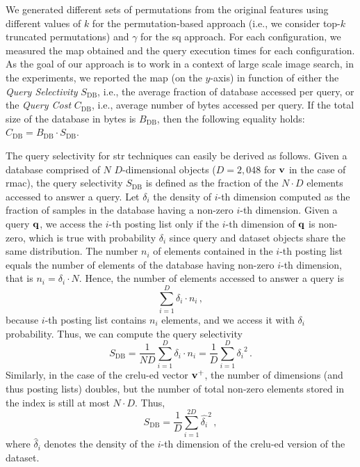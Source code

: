 We generated different sets of permutations from the original features using different values of $k$ for the permutation-based approach (i.e., we consider top-$k$ truncated permutations) and $\gamma$ for the \gls{sq} approach.
For each configuration, we measured the \acrfull{map} obtained and the query execution times for each configuration.
As the goal of our approach is to work in a context of large scale image search, in the experiments, we reported the \gls{map} (on the $y$-axis) in function of either the \emph{Query Selectivity} $S_\text{DB}$, i.e., the average fraction of database accessed per query, or the \emph{Query Cost} $C_\text{DB}$, i.e., average number of bytes accessed per query.
If the total size of the database in bytes is $B_\text{DB}$, then the following equality holds: $C_\text{DB} = B_\text{DB} \cdot S_\text{DB}$.


The query selectivity for \gls{str} techniques can easily be derived as follows.
Given a database comprised of $N$ $D$-dimensional objects ($D=2,048$ for $\mathbf{v}$ in the case of \gls{rmac}), the query selectivity $S_\text{DB}$ is defined as the fraction of the $N \cdot D$ elements accessed to answer a query.
Let $\delta_i$ the density of $i$-th dimension computed as the fraction of samples in the database having a non-zero $i$-th dimension.
Given a query $\mathbf{q}$, we access the $i$-th posting list only if the $i$-th dimension of $ \mathbf{q}$ is non-zero, which is true with probability $\delta_i$ since query and dataset objects share the same distribution.
The number $n_i$ of elements contained in the $i$-th posting list equals the number of elements of the database having non-zero $i$-th dimension, that is $n_i = \delta_i \cdot N$.
Hence, the number of elements accessed to answer a query is
\begin{equation}
\sum_{i=1}^D \delta_i \cdot n_i \,,
\end{equation}
because $i$-th posting list contains $n_i$ elements, and we access it with $\delta_i$ probability.
Thus, we can compute the query selectivity
\begin{equation}
S_\text{DB} = \frac{1}{ND} \sum_{i=1}^D \delta_i \cdot n_i = \frac{1}{D} \sum_{i=1}^D {\delta_i}^2\,.
\end{equation}
Similarly, in the case of the \gls{crelu}-ed vector $\mathbf{v}^+$, the number of dimensions (and thus posting lists) doubles, but the number of total non-zero elements stored in the index is still at most $N \cdot D$.
Thus,
\begin{equation}
S_\text{DB} = \frac{1}{D} \sum_{i=1}^{2D} \hat{\delta_i}^2 \,,
\end{equation}
where $\hat{\delta}_i$ denotes the density of the $i$-th dimension of the \gls{crelu}-ed version of the dataset.

